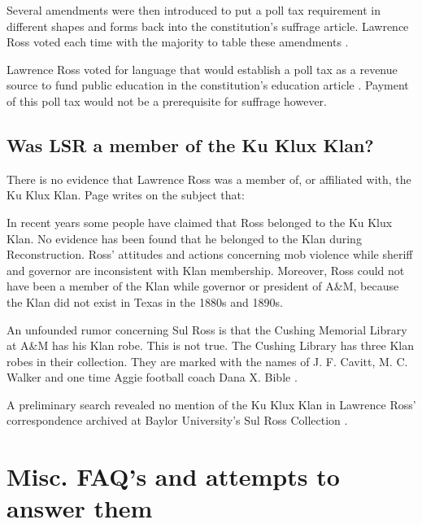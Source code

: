 \documentclass[12pt]{article}
\begin{document}
Several amendments were then introduced to put a poll tax requirement in different shapes and forms back into the constitution's suffrage article. Lawrence Ross voted each time with the majority to table these amendments \cite[pg. 308-310]{tx:1876constitution:journ}.

Lawrence Ross voted for language that would establish a poll tax as a revenue source to fund public education in the constitution's education article \cite[pg. 330-333]{tx:1876constitution:journ}. Payment of this poll tax would not be a prerequisite for suffrage however. 

\newpage
\subsection{Was LSR a member of the Ku Klux Klan?}
There is no evidence that Lawrence Ross was a member of, or affiliated with, the Ku Klux Klan. Page writes on the subject that:

\begin{displayquote}
In recent years some people have claimed that Ross belonged to the Ku Klux Klan.  No evidence has been found that he belonged to the Klan during Reconstruction.  Ross’ attitudes and actions concerning mob violence while sheriff and governor are inconsistent with Klan membership.  Moreover, Ross could not have been a member of the Klan while governor or president of A\&M, because the Klan did not exist in Texas in the 1880s and 1890s.

An unfounded rumor concerning Sul Ross is that the Cushing Memorial Library at A\&M has his Klan robe.  This is not true.  The Cushing Library has three Klan robes in their collection.  They are marked with the names of J. F. Cavitt, M. C. Walker and one time Aggie football coach Dana X. Bible \cite[pg. 253]{page}.
\end{displayquote}

A preliminary search revealed no mention of the Ku Klux Klan in Lawrence Ross' correspondence archived at Baylor University's Sul Ross Collection \cite{vaughan:email}.

\newpage
\section{Misc. FAQ's and attempts to answer them}
\end{document}
